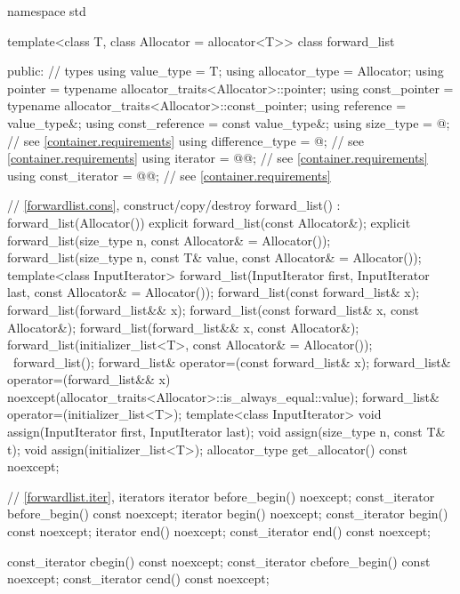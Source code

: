 \begin{codeblock}
namespace std {
  template<class T, class Allocator = allocator<T>>
  class forward_list {
  public:
    // types
    using value_type      = T;
    using allocator_type  = Allocator;
    using pointer         = typename allocator_traits<Allocator>::pointer;
    using const_pointer   = typename allocator_traits<Allocator>::const_pointer;
    using reference       = value_type&;
    using const_reference = const value_type&;
    using size_type       = @\impdef@; // see \ref{container.requirements}
    using difference_type = @\impdef@; // see \ref{container.requirements}
    using iterator        = @@; // see \ref{container.requirements}
    using const_iterator  = @@; // see \ref{container.requirements}

    // \ref{forwardlist.cons}, construct/copy/destroy
    forward_list() : forward_list(Allocator()) { }
    explicit forward_list(const Allocator&);
    explicit forward_list(size_type n, const Allocator& = Allocator());
    forward_list(size_type n, const T& value, const Allocator& = Allocator());
    template<class InputIterator>
      forward_list(InputIterator first, InputIterator last, const Allocator& = Allocator());
    forward_list(const forward_list& x);
    forward_list(forward_list&& x);
    forward_list(const forward_list& x, const Allocator&);
    forward_list(forward_list&& x, const Allocator&);
    forward_list(initializer_list<T>, const Allocator& = Allocator());
    ~forward_list();
    forward_list& operator=(const forward_list& x);
    forward_list& operator=(forward_list&& x)
      noexcept(allocator_traits<Allocator>::is_always_equal::value);
    forward_list& operator=(initializer_list<T>);
    template<class InputIterator>
      void assign(InputIterator first, InputIterator last);
    void assign(size_type n, const T& t);
    void assign(initializer_list<T>);
    allocator_type get_allocator() const noexcept;

    // \ref{forwardlist.iter}, iterators
    iterator before_begin() noexcept;
    const_iterator before_begin() const noexcept;
    iterator begin() noexcept;
    const_iterator begin() const noexcept;
    iterator end() noexcept;
    const_iterator end() const noexcept;

    const_iterator cbegin() const noexcept;
    const_iterator cbefore_begin() const noexcept;
    const_iterator cend() const noexcept;

}}
\end{codeblock}
